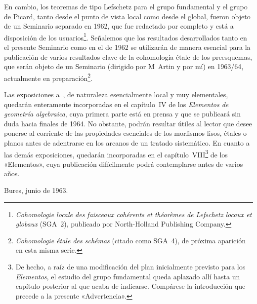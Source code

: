 En cambio, los teoremas de tipo Lefschetz para el grupo fundamental y el grupo de Picard, tanto desde el punto de vista local como desde el global, fueron objeto de un Seminario separado en 1962, que fue redactado por completo y está a disposición de los usuarios\footnote{\emph{Cohomologie locale des faisceaux cohérents et théorèmes de Lefschetz locaux et globaux} (SGA~2), publicado por North-Holland Publishing Company.}. Señalemos que los resultados desarrollados tanto en el presente Seminario como en el de 1962 se utilizarán de manera esencial para la publicación de varios resultados clave de la cohomología étale de los preesquemas, que serán objeto de un Seminario (dirigido por M\ptbl\ Artin y por mí) en 1963/64, actualmente en preparación\footnote{\emph{Cohomologie étale des schémas} (citado como SGA~4), de próxima aparición en esta misma serie.}.

Las exposiciones  a~, de naturaleza esencialmente local y muy elementales, quedarán enteramente incorporadas en el capítulo~IV de los \emph{Elementos de geometría algebraica}, cuya primera parte está en prensa y que se publicará sin duda hacia finales de 1964. No obstante, podrán resultar útiles al lector que desee ponerse al corriente de las propiedades esenciales de los morfismos lisos, étales o planos antes de adentrarse en los arcanos de un tratado sistemático. En cuanto a las demás exposiciones, quedarán incorporadas en el capítulo~VIII\footnote{De hecho, a raíz de una modificación del plan inicialmente previsto para los \emph{Elementos}, el estudio del grupo fundamental queda aplazado allí hasta un capítulo posterior al que acaba de indicarse. Compárese la introducción que precede a la presente «Advertencia».} de los «Elementos», cuya publicación difícilmente podrá contemplarse antes de varios años.

\bigskip\hfill Bures, junio de 1963.

{\def\footnotemark{}
\tableofcontents}

\mainmatter
\renewcommand{\chaptername}{Exposición}
\let\thesubsection\oldthesubsection

